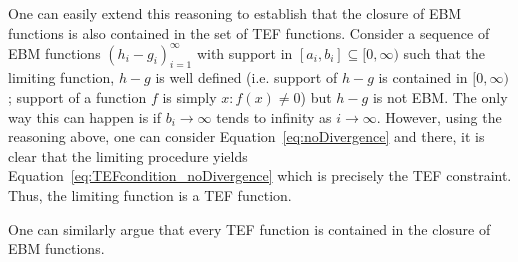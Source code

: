 \documentclass{theoretics}
\begin{document}
One can easily extend this reasoning to establish that the closure
of EBM functions is also contained in the set of TEF functions. Consider
a sequence of EBM functions $(h_{i}-g_{i})_{i=1}^{\infty}$ with support
in $[a_{i},b_{i}]\subseteq[0,\infty)$ such that the limiting function, $h-g$
is well defined (i.e. support of $h-g$ is contained in $[0,\infty)$; support of a function $f$ is simply ${x:f(x)\neq 0}$) but $h-g$ is not EBM. The only way this can happen is if $b_{i}\to\infty$
tends to infinity as $i\to\infty$. However, using the reasoning above,
one can consider Equation~\eqref{eq:noDivergence} and there, it is clear that
the limiting procedure yields Equation~\eqref{eq:TEFcondition_noDivergence} which
is precisely the TEF constraint. Thus, the limiting function is a
TEF function.

One can similarly argue that every TEF function is contained in the
closure of EBM functions.
\end{document}
